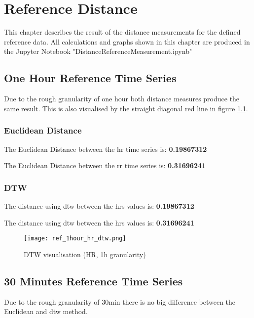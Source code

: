 \chapter{Reference Distance}

This chapter describes the result of the distance measurements for the defined reference data. All calculations and graphs shown in this chapter are produced in the Jupyter Notebook "DistanceReferenceMeasurement.ipynb"

\section{One Hour Reference Time Series}

Due to the rough granularity of one hour both distance measures produce the same result. This is also visualised by the straight diagonal red line in figure \ref{fig:ref_dtw_dist_one_h_granularity}.

\subsection{Euclidean Distance}

The Euclidean Distance between the \ac{hr} time series is: \textbf{0.19867312}


The Euclidean Distance between the \ac{rr} time series is: \textbf{0.31696241}


\subsection{DTW}

The distance using \ac{dtw} between the \acp{hr} values is: \textbf{0.19867312}


The distance using \ac{dtw} between the \acp{hr} values is: \textbf{0.31696241}

\begin{figure}[h!]
	\texttt{[image: ref\_1hour\_hr\_dtw.png]}
	\caption{DTW visualisation (HR, 1h granularity)}
	\label{fig:ref_dtw_dist_one_h_granularity}
\end{figure}




\clearpage
\section{30 Minutes Reference Time Series}

Due to the rough granularity of 30min there is no big difference between the Euclidean and \ac{dtw} method.